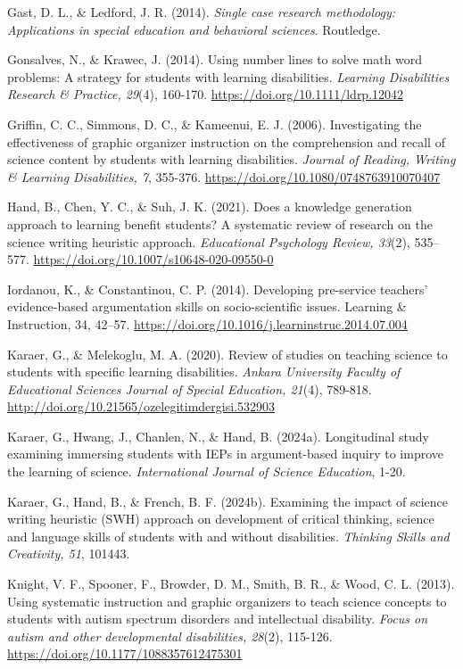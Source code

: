 \documentclass[11.5pt]{sig-alternate} %
\begin{document}
Gast, D. L., \& Ledford, J. R. (2014). \textit{Single case research methodology: Applications in special education and behavioral sciences}. Routledge.

Gonsalves, N., \& Krawec, J. (2014). Using number lines to solve math word problems: A strategy for students with learning disabilities. \textit{Learning Disabilities Research \& Practice, 29}(4), 160-170. \url{https://doi.org/10.1111/ldrp.12042}

Griffin, C. C., Simmons, D. C., \& Kameenui, E. J. (2006). Investigating the effectiveness of graphic organizer instruction on the comprehension and recall of science content by students with learning disabilities. \textit{Journal of Reading, Writing \& Learning Disabilities, 7}, 355-376. \url{https://doi.org/10.1080/0748763910070407}

Hand, B., Chen, Y. C., \& Suh, J. K. (2021). Does a knowledge generation approach to learning benefit students? A systematic review of research on the science writing heuristic approach. \textit{Educational Psychology Review, 33}(2), 535–577. \url{https://doi.org/10.1007/s10648-020-09550-0}

Iordanou, K., \& Constantinou, C. P. (2014). Developing pre-service teachers’ evidence-based argumentation skills on socio-scientific issues. Learning \& Instruction, 34, 42–57. \url{https://doi.org/10.1016/j.learninstruc.2014.07.004}

Karaer, G., \& Melekoglu, M. A. (2020). Review of studies on teaching science to students with specific learning disabilities. \textit{Ankara University Faculty of Educational Sciences Journal of Special Education, 21}(4), 789-818. \url{http://doi.org/10.21565/ozelegitimdergisi.532903}

Karaer, G., Hwang, J., Chanlen, N., \& Hand, B. (2024a). Longitudinal study examining immersing students with IEPs in argument-based inquiry to improve the learning of science. \textit{International Journal of Science Education}, 1-20.

Karaer, G., Hand, B., \& French, B. F. (2024b). Examining the impact of science writing heuristic (SWH) approach on development of critical thinking, science and language skills of students with and without disabilities. \textit{Thinking Skills and Creativity, 51}, 101443.

Knight, V. F., Spooner, F., Browder, D. M., Smith, B. R., \& Wood, C. L. (2013). Using systematic instruction and graphic organizers to teach science concepts to students with autism spectrum disorders and intellectual disability. \textit{Focus on autism and other developmental disabilities, 28}(2), 115-126. \url{https://doi.org/10.1177/1088357612475301}
\end{document}
